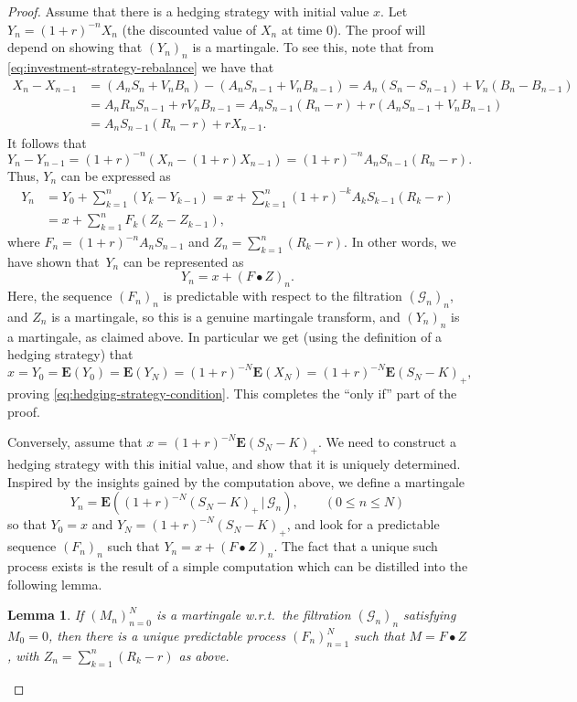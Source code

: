\documentclass[12pt]{article}
\newtheorem{lem}[thm]{Lemma}
\newcommand{\expec}{\mathbf{E}}
\newcommand{\condexp}[2]{\expec\left(#1\,|\,#2\right)}
\theoremstyle{example}
\begin{document}
\begin{proof} Assume that there is a hedging strategy with initial value $x$. 
Let $Y_n = (1+r)^{-n} X_n$ (the discounted value of $X_n$ at time $0$). The proof will depend on showing that $(Y_n)_n$ is a martingale. To see this, note that from \eqref{eq:investment-strategy-rebalance} we have that
\begin{align*}
X_n - X_{n-1} &= (A_n S_n + V_n B_n) - (A_n S_{n-1} + V_n B_{n-1})
= A_n (S_n-S_{n-1}) + V_n (B_n-B_{n-1})
\\ &= A_n R_n S_{n-1} + r V_n B_{n-1} = A_n S_{n-1}(R_n-r) + r(A_n S_{n-1} + V_n B_{n-1})
\\ &= A_n S_{n-1} (R_n-r) + r X_{n-1}.
\end{align*}
It follows that
$$
Y_n-Y_{n-1} = (1+r)^{-n}(X_n-(1+r)X_{n-1}) = (1+r)^{-n}A_n S_{n-1}(R_n-r).
$$
Thus, $Y_n$ can be expressed as
\begin{align*}
Y_n &= Y_0 + \sum_{k=1}^n (Y_k-Y_{k-1}) =
x + \sum_{k=1}^n (1+r)^{-k}A_k S_{k-1} (R_k-r)
\\ &= x + \sum_{k=1}^n F_k (Z_k-Z_{k-1}),
\end{align*}
where $F_n = (1+r)^{-n} A_n S_{n-1}$ and $Z_n = \sum_{k=1}^n (R_k-r)$. In other words, we have shown that~$Y_n$ can be represented as
$$ Y_n = x + (F\bullet Z)_n. $$
Here, the sequence $(F_n)_n$ is predictable with respect to the filtration $(\mathcal{G}_n)_n$, and $Z_n$ is a martingale, so this is a genuine martingale transform, and $(Y_n)_n$ is a martingale, as claimed above. In particular we get (using the definition of a hedging strategy) that
$$
x = Y_0 = \expec(Y_0) = \expec(Y_N) = (1+r)^{-N} \expec(X_N) = (1+r)^{-N} \expec(S_N-K)_+,
$$
proving \eqref{eq:hedging-strategy-condition}. This completes the ``only if'' part of the proof.

Conversely, assume that $x=(1+r)^{-N} \expec(S_N-K)_+$. We need to construct a hedging strategy with this initial value, and show that it is uniquely determined. Inspired by the insights gained by the computation above, we define a martingale
$$ Y_n = \condexp{(1+r)^{-N}(S_N-K)_+}{\mathcal{G}_n}, \qquad (0\le n\le N) $$
so that $Y_0 = x$ and $Y_N = (1+r)^{-N} (S_N-K)_+$, and look for a predictable sequence $(F_n)_n$ such that $Y_n = x + (F\bullet Z)_n$. The fact that a unique such process exists is the result of a simple computation which can be distilled into the following lemma.

\begin{lem}
\label{lem-easy-martingale-rep}
If $(M_n)_{n=0}^N$ is a martingale w.r.t.\ the filtration $(\mathcal{G}_n)_n$ satisfying $M_0 = 0$, then there is a unique predictable process $(F_n)_{n=1}^N$ such that $M = F\bullet Z$, with $Z_n=\sum_{k=1}^n (R_k-r)$ as above.
\end{lem}


\end{proof}
\end{document}
